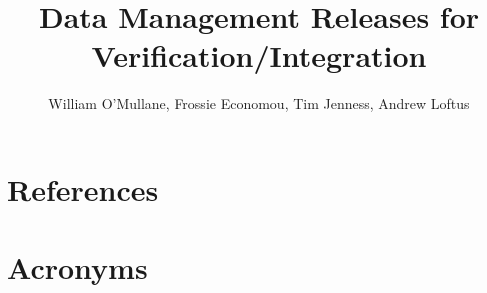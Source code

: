 \documentclass[DM]{lsstdoc}
\title[DM Releases ]{ Data Management Releases for Verification/Integration}
\author   {William O'Mullane, Frossie Economou, Tim Jenness, Andrew Loftus}
\begin{document}
%
%
\maketitle

%
%



\section{References\label{sect:references}}
\renewcommand{\refname}{}


\section{Acronyms}
\end{document}
